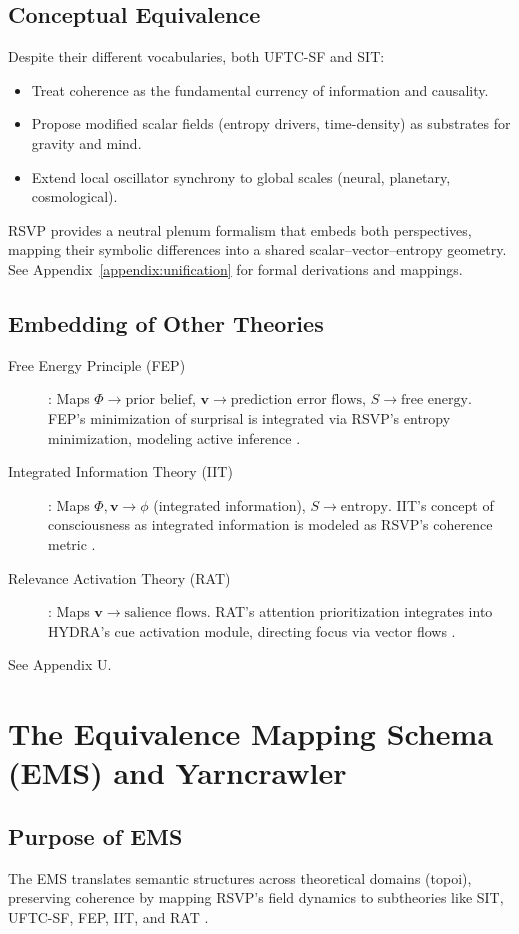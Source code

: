 \documentclass[12pt]{report}
\newcommand{\PhiRSVP}{\Phi}
\newcommand{\vRSVP}{\mathbf{v}}
\newcommand{\SRSVP}{S}
\begin{document}
\section{Conceptual Equivalence}

Despite their different vocabularies, both UFTC-SF and SIT:
\begin{itemize}
    \item Treat coherence as the fundamental currency of information and causality.
    \item Propose modified scalar fields (entropy drivers, time-density) as substrates for gravity and mind.
    \item Extend local oscillator synchrony to global scales (neural, planetary, cosmological).
\end{itemize}
RSVP provides a neutral plenum formalism that embeds both perspectives, mapping their symbolic differences into a shared scalar--vector--entropy geometry.  
See Appendix~\ref{appendix:unification} for formal derivations and mappings.


\section{Embedding of Other Theories}
\begin{description}
    \item[Free Energy Principle (FEP)]: Maps \(\PhiRSVP \to \text{prior belief}\), \(\vRSVP \to \text{prediction error flows}\), \(\SRSVP \to \text{free energy}\). FEP’s minimization of surprisal is integrated via RSVP’s entropy minimization, modeling active inference \citep{Friston2010}.
    \item[Integrated Information Theory (IIT)]: Maps \(\PhiRSVP, \vRSVP \to \phi\) (integrated information), \(\SRSVP \to \text{entropy}\). IIT’s concept of consciousness as integrated information is modeled as RSVP’s coherence metric \citep{Tononi2016}.
    \item[Relevance Activation Theory (RAT)]: Maps \(\vRSVP \to \text{salience flows}\). RAT’s attention prioritization integrates into HYDRA’s cue activation module, directing focus via vector flows \citep{RAT2025}.
\end{description}
See Appendix U.

\chapter{The Equivalence Mapping Schema (EMS) and Yarncrawler}
\section{Purpose of EMS}
The EMS translates semantic structures across theoretical domains (topoi), preserving coherence by mapping RSVP’s field dynamics to subtheories like SIT, UFTC-SF, FEP, IIT, and RAT \citep{RSVPMeta2025}.
\end{document}
